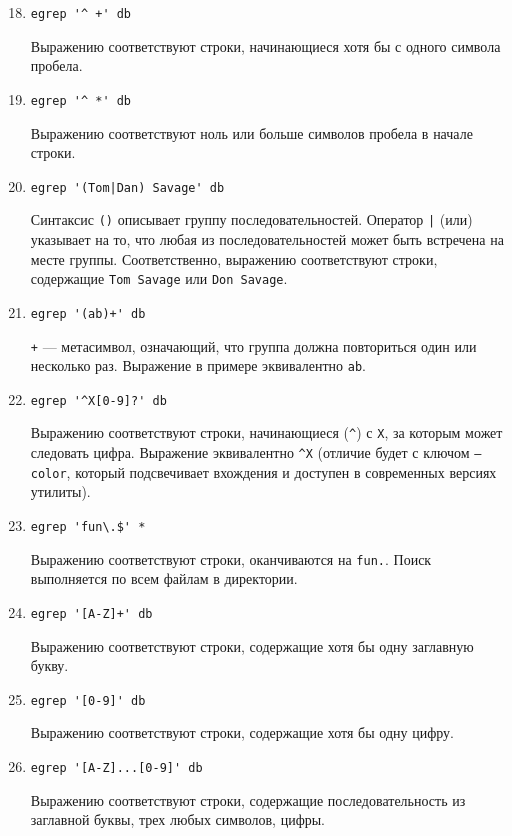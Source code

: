 \documentclass[listings]{labreport}
\begin{document}
\begin{enumerate}
\setcounter{enumi}{17}

\item \verb|egrep '^ +' db|

Выражению соответствуют строки, начинающиеся хотя бы с одного символа пробела.

\item \verb|egrep '^ *' db|

Выражению соответствуют ноль или больше символов пробела в начале строки.

\item \verb=egrep '(Tom|Dan) Savage' db=

Синтаксис \verb|()| описывает группу последовательностей. Оператор \verb=|= (или) указывает на то,
что любая из последовательностей может быть встречена на месте группы.
Соответственно, выражению соответствуют строки, содержащие \texttt{Tom Savage} или \texttt{Don Savage}.

\item \verb|egrep '(ab)+' db|

\verb|+| — метасимвол, означающий, что группа должна повториться один или несколько раз.
Выражение в примере эквивалентно \verb|ab|.

\item \verb|egrep '^X[0-9]?' db|

Выражению соответствуют строки, начинающиеся (\verb|^|) с \texttt{X},
за которым может следовать цифра. Выражение эквивалентно \verb|^X|
(отличие будет с ключом \texttt{--color}, который подсвечивает вхождения
и доступен в современных версиях утилиты).

\item \verb|egrep 'fun\.$' *|

Выражению соответствуют строки, оканчиваются на \texttt{fun.}. Поиск выполняется
по всем файлам в директории.

\item \verb|egrep '[A-Z]+' db|

Выражению соответствуют строки, содержащие хотя бы одну заглавную букву.

\item \verb|egrep '[0-9]' db|

Выражению соответствуют строки, содержащие хотя бы одну цифру.

\item \verb|egrep '[A-Z]...[0-9]' db|

Выражению соответствуют строки, содержащие последовательность из заглавной буквы,
трех любых символов, цифры.


\end{enumerate}
\end{document}
